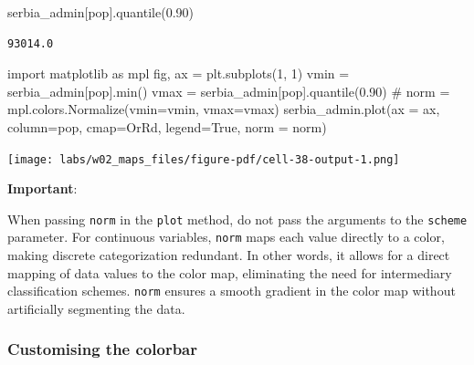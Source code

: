 \documentclass[
  letterpaper,
  DIV=11,
  numbers=noendperiod]{scrreprt}
\newenvironment{Shaded}{\begin{snugshade}}{\end{snugshade}}
\newcommand{\BuiltInTok}[1]{\textcolor[rgb]{0.00,0.23,0.31}{#1}}
\newcommand{\CommentTok}[1]{\textcolor[rgb]{0.37,0.37,0.37}{#1}}
\newcommand{\DecValTok}[1]{\textcolor[rgb]{0.68,0.00,0.00}{#1}}
\newcommand{\FloatTok}[1]{\textcolor[rgb]{0.68,0.00,0.00}{#1}}
\newcommand{\ImportTok}[1]{\textcolor[rgb]{0.00,0.46,0.62}{#1}}
\newcommand{\NormalTok}[1]{\textcolor[rgb]{0.00,0.23,0.31}{#1}}
\newcommand{\OperatorTok}[1]{\textcolor[rgb]{0.37,0.37,0.37}{#1}}
\newcommand{\StringTok}[1]{\textcolor[rgb]{0.13,0.47,0.30}{#1}}
\newcommand{\VariableTok}[1]{\textcolor[rgb]{0.07,0.07,0.07}{#1}}
\begin{document}
\begin{Shaded}
\begin{Highlighting}[]
\NormalTok{serbia\_admin[}\StringTok{\textquotesingle{}pop\textquotesingle{}}\NormalTok{].quantile(}\FloatTok{0.90}\NormalTok{)}
\end{Highlighting}
\end{Shaded}

\begin{verbatim}
93014.0
\end{verbatim}

\begin{Shaded}
\begin{Highlighting}[]
\ImportTok{import}\NormalTok{ matplotlib }\ImportTok{as}\NormalTok{ mpl}
\NormalTok{fig, ax }\OperatorTok{=}\NormalTok{ plt.subplots(}\DecValTok{1}\NormalTok{, }\DecValTok{1}\NormalTok{)}
\NormalTok{vmin }\OperatorTok{=}\NormalTok{ serbia\_admin[}\StringTok{\textquotesingle{}pop\textquotesingle{}}\NormalTok{].}\BuiltInTok{min}\NormalTok{()}
\NormalTok{vmax }\OperatorTok{=}\NormalTok{ serbia\_admin[}\StringTok{\textquotesingle{}pop\textquotesingle{}}\NormalTok{].quantile(}\FloatTok{0.90}\NormalTok{) }\CommentTok{\# }
\NormalTok{norm }\OperatorTok{=}\NormalTok{ mpl.colors.Normalize(vmin}\OperatorTok{=}\NormalTok{vmin, vmax}\OperatorTok{=}\NormalTok{vmax)}
\NormalTok{serbia\_admin.plot(ax }\OperatorTok{=}\NormalTok{ ax, column}\OperatorTok{=}\StringTok{\textquotesingle{}pop\textquotesingle{}}\NormalTok{, cmap}\OperatorTok{=}\StringTok{\textquotesingle{}OrRd\textquotesingle{}}\NormalTok{, legend}\OperatorTok{=}\VariableTok{True}\NormalTok{, norm }\OperatorTok{=}\NormalTok{ norm)}
\end{Highlighting}
\end{Shaded}

\texttt{[image: labs/w02\_maps\_files/figure-pdf/cell-38-output-1.png]}

\textbf{Important}:

When passing \texttt{norm} in the \texttt{plot} method, do not pass the
arguments to the \texttt{scheme} parameter. For continuous variables,
\texttt{norm} maps each value directly to a color, making discrete
categorization redundant. In other words, it allows for a direct mapping
of data values to the color map, eliminating the need for intermediary
classification schemes. \texttt{norm} ensures a smooth gradient in the
color map without artificially segmenting the data.

\subsubsection{Customising the colorbar}\label{customising-the-colorbar}
\end{document}
